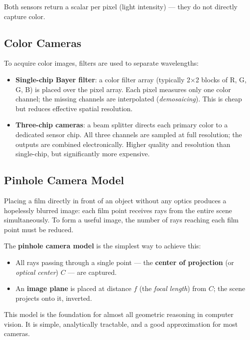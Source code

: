 \documentclass[11pt,a4paper]{article}
\theoremstyle{definition}
\theoremstyle{plain}
\theoremstyle{remark}
\begin{document}
Both sensors return a scalar per pixel (light intensity) — they do not directly capture color.

\subsection{Color Cameras}

To acquire color images, filters are used to separate wavelengths:

\begin{itemize}
    \item \textbf{Single-chip Bayer filter}: a color filter array (typically 2$\times$2 blocks of R, G, G, B) is placed over the pixel array. Each pixel measures only one color channel; the missing channels are interpolated (\textit{demosaicing}). This is cheap but reduces effective spatial resolution.
    \item \textbf{Three-chip cameras}: a beam splitter directs each primary color to a dedicated sensor chip. All three channels are sampled at full resolution; the outputs are combined electronically. Higher quality and resolution than single-chip, but significantly more expensive.
\end{itemize}

\subsection{Pinhole Camera Model}

Placing a film directly in front of an object without any optics produces a hopelessly blurred image: each film point receives rays from the entire scene simultaneously. To form a useful image, the number of rays reaching each film point must be reduced.

The \textbf{pinhole camera model} is the simplest way to achieve this:

\begin{itemize}
    \item All rays passing through a single point — the \textbf{center of projection} (or \textit{optical center}) $C$ — are captured.
    \item An \textbf{image plane} is placed at distance $f$ (the \textit{focal length}) from $C$; the scene projects onto it, inverted.
\end{itemize}

This model is the foundation for almost all geometric reasoning in computer vision. It is simple, analytically tractable, and a good approximation for most cameras.
\end{document}
